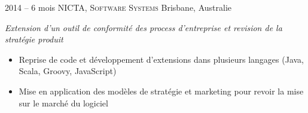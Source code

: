 \documentclass[]{friggeri-cv} %
\begin{document}
\begin{entrylist}
\entry
{2014 -- 6 mois}
{NICTA, \textsc{Software Systems}}
{Brisbane, Australie}
{\emph{Extension d'un outil de conformité des process d'entreprise et revision de la stratégie produit}
\begin{itemize}
\item Reprise de code et développement d'extensions dans plusieurs langages (Java, Scala, Groovy, JavaScript)
\item Mise en application des modèles de stratégie et marketing pour revoir la mise sur le marché du logiciel
\end{itemize}
}


\end{entrylist}
\end{document}
